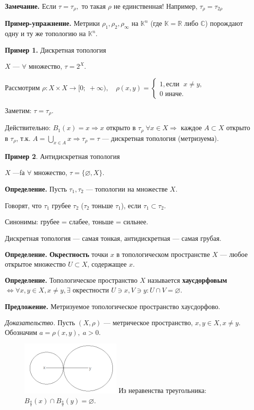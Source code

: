 \documentclass[12pt,a4paper]{article}
\begin{document}
\textbf{Замечание.} Если $\tau = \tau_{\rho},$ то такая $\rho$ не единственная! Например, $\tau_{\rho} = \tau_{2\rho}$

\textbf{Пример-упражнение.} Метрики $\rho_1, \rho_2, \rho_{\infty}$ на $\mathbb{K}^n$ (где $\mathbb{K} = \mathbb{R}$ либо $\mathbb{C}$) порождают одну и ту же топологию на $\mathbb{K}^n.$

\textbf{Пример 1.} Дискретная топология

$X$ --- $\forall$ множество, $\tau = 2^X.$

Рассмотрим $\rho\!\!: X \times X \to [0; \; +\infty), \quad \rho(x,y) = \begin{cases} 1, \text{если } \; x \neq y, \\ 0 \text{ иначе.} \end{cases}$

Заметим: $\tau = \tau_{\rho}.$

Действительно: $B_1(x) = {x} \Rightarrow {x}$ открыто в $\tau_{\rho} \; \forall x \in X \Rightarrow$ каждое $A \subset X$ открыто в $\tau_{\rho}$, т.к. $A = \bigcup_{x\in A} {x} \Rightarrow \tau_{\rho} = \tau$ --- дискретная топология (метризуема).

\textbf{Пример 2}. Антидискретная топология

$X$ ---fа $\forall$ множество, $\tau = \{\varnothing, X\}.$

\textbf{Определение.} Пусть $\tau_1, \tau_2$ --- топологии на множестве $X.$

Говорят, что $\tau_1$ грубее $\tau_2$ ($\tau_2$ тоньше $\tau_1$), если $\tau_1 \subset \tau_2.$

Синонимы: грубее = слабее, тоньше = сильнее.

Дискретная топология --- самая тонкая, антидискретная --- самая грубая.

\textbf{Определение.} \textbf{Окрестность} точки $x$ в топологическом пространстве $X$ --- любое открытое множество $U \subset X$, содержащее $x.$

\textbf{Определение.} Топологическое пространство $X$ называется \textbf{хаусдорфовым} $\Leftrightarrow \forall x, y \in X, x \neq y, \exists$ окрестности $U \ni x, V \ni y: U \cap V = \varnothing.$

\textbf{Предложение.} Метризуемое топологическое пространство хаусдорфово.

\textit{Доказательство.} Пусть $(X, \rho)$ --- метрическое пространство, $x, y \in X, x \neq y$. Обозначим $a = \rho(x, y), \; a > 0.$

\begin{figure}
	\includegraphics[width = 5cm]{lect2_4.png}
	Из неравенства треугольника: $B_{\frac{a}{2}}(x) \cap B_{\frac{a}{2}}(y) = \varnothing.$
\end{figure}
\end{document}
